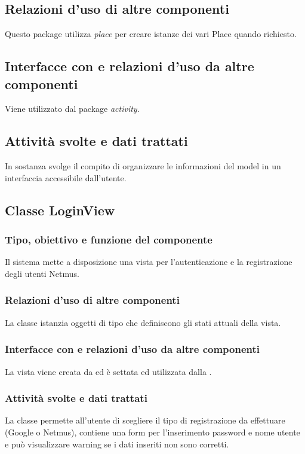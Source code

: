 \subsection*{Relazioni d'uso di altre componenti}
Questo package utilizza \emph{place} per creare istanze dei vari Place quando
richiesto.

\subsection*{Interfacce con e relazioni d'uso da altre componenti}
Viene utilizzato dal package \emph{activity}.

\subsection*{Attivit\`a svolte e dati trattati}
In sostanza svolge il compito di organizzare le informazioni del model in un
interfaccia accessibile dall'utente.

\subsection{Classe LoginView}
\subsubsection*{Tipo, obiettivo e funzione del componente}
Il sistema mette a disposizione una vista per l'autenticazione e la
registrazione degli utenti Netmus.
\subsubsection*{Relazioni d'uso di altre componenti}
La classe istanzia oggetti di tipo  che definiscono gli stati
attuali della vista.
\subsubsection*{Interfacce con e relazioni d'uso da altre componenti}
La vista viene creata da  ed \`e settata ed utilizzata dalla
.
\subsubsection*{Attivit\`a svolte e dati trattati}
La classe permette all'utente di scegliere il tipo di registrazione da
effettuare (Google o Netmus), contiene una form per l'inserimento password e
nome utente e pu\`o visualizzare warning se i dati inseriti non sono corretti.

